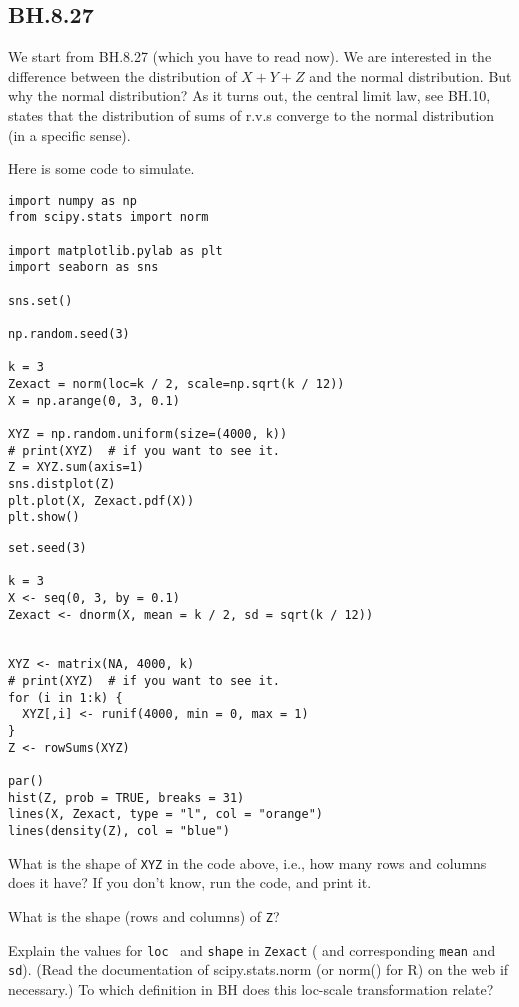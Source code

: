 \subsection{BH.8.27}

We start from BH.8.27 (which you have to read now).  We are interested in the difference between the distribution of $X+Y+Z$ and the normal distribution. But why the normal distribution? As it turns out, the central limit law, see BH.10, states that the distribution of sums of r.v.s converge to the normal distribution (in a specific sense).

Here is some code to simulate.

\begin{verbatim}
import numpy as np
from scipy.stats import norm

import matplotlib.pylab as plt
import seaborn as sns

sns.set()

np.random.seed(3)

k = 3
Zexact = norm(loc=k / 2, scale=np.sqrt(k / 12))
X = np.arange(0, 3, 0.1)

XYZ = np.random.uniform(size=(4000, k))
# print(XYZ)  # if you want to see it.
Z = XYZ.sum(axis=1)
sns.distplot(Z)
plt.plot(X, Zexact.pdf(X))
plt.show()
\end{verbatim}

\begin{verbatim}
set.seed(3)

k = 3
X <- seq(0, 3, by = 0.1)
Zexact <- dnorm(X, mean = k / 2, sd = sqrt(k / 12))


XYZ <- matrix(NA, 4000, k)
# print(XYZ)  # if you want to see it.
for (i in 1:k) {
  XYZ[,i] <- runif(4000, min = 0, max = 1)
}
Z <- rowSums(XYZ)

par()
hist(Z, prob = TRUE, breaks = 31)
lines(X, Zexact, type = "l", col = "orange")
lines(density(Z), col = "blue")
\end{verbatim}


\begin{exercise}
What is the shape of \verb|XYZ| in the code above, i.e., how many rows and columns does it have? If you don't know, run the code, and print it.
\end{exercise}

\begin{exercise}
What is the shape (rows and columns) of \verb|Z|?
\end{exercise}

\begin{exercise}
Explain the values for \verb|loc|~ and \verb|shape| in \verb|Zexact| ( and corresponding \verb|mean| and \verb|sd|).
  (Read the documentation of scipy.stats.norm (or norm() for R) on the web if necessary.)
  To which definition in BH does this loc-scale transformation relate?
\end{exercise}


